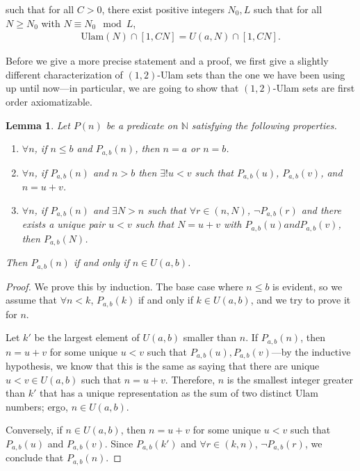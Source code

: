 \documentclass{amsart}
\newcommand{\NN}{\mathbb{N}}
\theoremstyle{theorem}
\newtheorem{lemma}{Lemma}[section]
\theoremstyle{definition}
\begin{document}
\noindent such that for all $C > 0$, there exist positive integers $N_0, L$ such that for all $N \geq N_0$ with $N \equiv N_0 \mod L$,
	\begin{align*}
    \text{Ulam}(N) \cap [1,CN] = U(a,N) \cap [1,CN].
    \end{align*}
    
\noindent Before we give a more precise statement and a proof, we first give a slightly different characterization of $(1,2)$-Ulam sets than the one we have been using up until now---in particular, we are going to show that $(1,2)$-Ulam sets are first order axiomatizable.

\begin{lemma}\label{FirstOrderDescription}
Let $P(n)$ be a predicate on $\NN$ satisfying the following properties.
	
	\begin{enumerate}
		\item $\forall n$, if $n \leq b$ and $P_{a,b}(n)$, then $n = a$ or $n = b$.
		\item $\forall n$, if $P_{a,b}(n)$ and $n > b$ then $\exists ! u<v$ such that $P_{a,b}(u)$, $P_{a,b}(v)$, and $n = u + v$.
		\item $\forall n$, if $P_{a,b}(n)$ and $\exists N > n$ such that $\forall r \in (n,N)$, $\neg P_{a,b}(r)$ and there exists a unique pair $u<v$ such that $N = u + v$ with $P_{a,b}(u) and P_{a,b}(v)$, then $P_{a,b}(N)$.
	\end{enumerate}
		
\noindent Then $P_{a,b}(n)$ if and only if $n \in U(a,b)$.
\end{lemma}
	
\begin{proof}
We prove this by induction. The base case where $n \leq b$ is evident, so we assume that $\forall n < k$, $P_{a,b}(k)$ if and only if $k \in U(a,b)$, and we try to prove it for $n$.
	
Let $k'$ be the largest element of $U(a,b)$ smaller than $n$. If $P_{a,b}(n)$, then $n = u + v$ for some unique $u<v$ such that $P_{a,b}(u), P_{a,b}(v)$---by the inductive hypothesis, we know that this is the same as saying that there are unique $u<v \in U(a,b)$ such that $n = u + v$. Therefore, $n$ is the smallest integer greater than $k'$ that has a unique representation as the sum of two distinct Ulam numbers; ergo, $n \in U(a,b)$.
	
Conversely, if $n \in U(a,b)$, then $n = u + v$ for some unique $u < v$ such that $P_{a,b}(u)$ and $P_{a,b}(v)$. Since $P_{a,b}(k')$ and $\forall r \in (k,n)$, $\neg P_{a,b}(r)$, we conclude that $P_{a,b}(n)$.
\end{proof}
	
\end{document}
